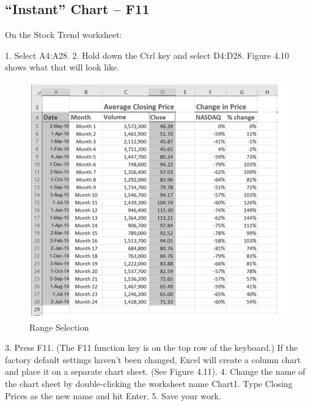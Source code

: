 \subsection{``Instant'' Chart – F11}

On the Stock Trend worksheet:

1. Select A4:A28.
2. Hold down the Ctrl key and select D4:D28. Figure 4.10 shows what that will look like.


\begin{figure}[H]
	\centering
	\includegraphics[width=\maxwidth{.95\linewidth}]{gfx/ch04_fig11}
	\caption{Range Selection}
	\label{04:fig11}
\end{figure}





3. Press F11. (The F11 function key is on the top row of the keyboard.) If the factory default
settings haven’t been changed, Excel will create a column chart and place it on a separate chart
sheet. (See Figure 4.11).
4. Change the name of the chart sheet by double-clicking the worksheet name Chart1. Type
Closing Prices as the new name and hit Enter.
5. Save your work.



